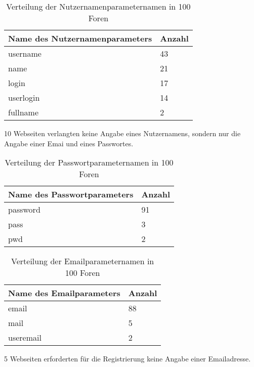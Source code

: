 
\begin{table}[h!]
\centering 
\begin{tabular}{ | p{7cm} | p{3cm}|} \hline
Name des Nutzernamenparameters & Anzahl \\ \hline
username & 43 \\ \hline
name & 21 \\ \hline
login & 17 \\ \hline
userlogin & 14 \\ \hline
fullname & 2 \\ \hline
\end{tabular}
\caption{Verteilung der Nutzernamenparameternamen in 100 Foren}
\end{table}

10 Webseiten verlangten keine Angabe eines Nutzernamens, sondern nur die Angabe einer Emai und eines Passwortes.

\begin{table}[h!]
\centering 
\begin{tabular}{ | p{7cm} | p{3cm}|} \hline
Name des Passwortparameters & Anzahl \\ \hline
password & 91 \\ \hline
pass & 3 \\ \hline
pwd & 2 \\ \hline
\end{tabular}
\caption{Verteilung der Passwortparameternamen in 100 Foren}
\end{table}

\begin{table}[h!]
\centering 
\begin{tabular}{ | p{7cm} | p{3cm}|} \hline
Name des Emailparameters & Anzahl \\ \hline
email & 88 \\ \hline
mail & 5 \\ \hline
useremail & 2 \\ \hline
\end{tabular}
\caption{Verteilung der Emailparameternamen in 100 Foren}
\end{table}

5 Webseiten erforderten für die Registrierung keine Angabe einer Emailadresse.


